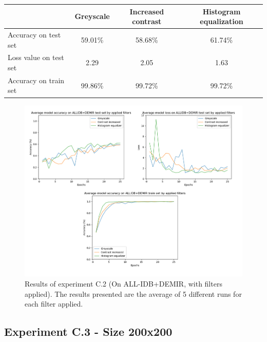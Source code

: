 \documentclass[11pt, openany]{report}
\theoremstyle{plain}
\theoremstyle{definition}
\theoremstyle{remark}
\begin{document}
\begin{center}
\begin{tabular}{|l|c|c|c|}
  \hline
   & \textbf{Greyscale} & \textbf{Increased contrast} & \textbf{Histogram equalization} \\
  \hline
  Accuracy on test set & 59.01\% & 58.68\% & 61.74\% \\
  Loss value on test set & 2.29 & 2.05 &  1.63\\ 
  Accuracy on train set & 99.86\% & 99.72\% & 99.72\% \\ 
  \hline
\end{tabular}
\label{table:results-C2}
\end{center}


\begin{figure}[H]
  \centering
  \includegraphics[scale=0.5]{Code/ch6-LeukemiaSubtypes/figures_result/LEUK-SUBTYPES/leukSub-filters.PNG}
  \caption{Results of experiment C.2 (On ALL-IDB+DEMIR, with filters applied). The results presented are the average of 5 different runs for each filter applied.}
  \label{fig:results-C2}
\end{figure}


\subsection{Experiment C.3 - Size 200x200}
\end{document}
